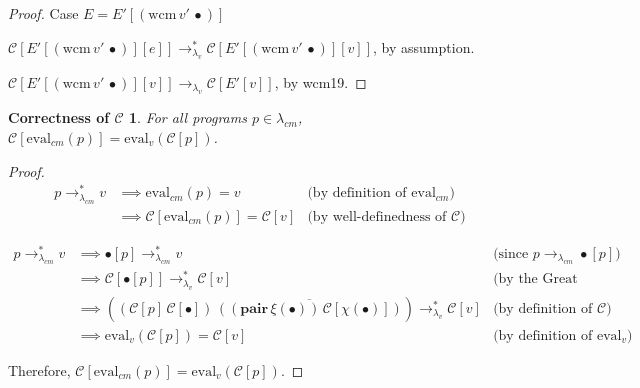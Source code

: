 \documentclass[ms,electronic,twosidetoc,letterpaper,chaptercenter,parttop]{byumsphd}
\newcommand{\pair}[2]{((\mathbf{pair}\,#1)\,#2)}
\newcommand{\eval}[1]{\overline{#1}}
\newcommand{\lvrr}{\rightarrow_{\lambda_v}}
\newcommand{\lvrrs}{\rightarrow_{\lambda_v}^{*}}
\newcommand{\cmrr}{\rightarrow_{\lambda_{cm}}}
\newcommand{\cmrrs}{\rightarrow_{\lambda_{cm}}^{*}}
\newcommand{\C}[1]{\mathcal{C}[#1]}
\newcommand{\app}[2]{(#1\,#2)}
\newcommand{\wcm}[2]{(\mathrm{wcm}\,#1\,#2)}
\newcommand{\hole}{\bullet}
\begin{document}
\begin{proof}{Case $E=E'[\wcm{v'}{\hole}]$}

$\C{E'[\wcm{v'}{\hole}][e]}\lvrrs\C{E'[\wcm{v'}{\hole}][v]}$, by assumption.

$\C{E'[\wcm{v'}{\hole}][v]}\lvrr \C{E'[v]}$, by wcm19. 
\end{proof}

\newtheorem*{maintheorem}{Correctness of $\mathcal{C}$}
\begin{maintheorem}
For all programs $p\in\lambda_{cm}$, $\C{\mathrm{eval}_{cm}(p)}=\mathrm{eval}_{v}(\C{p})$.
\end{maintheorem}

\begin{proof}

\begin{align*}
p\cmrrs v &\implies\mathrm{eval}_{cm}(p)=v &\text{(by definition of $\mathrm{eval}_{cm}$)}\\
          &\implies\C{\mathrm{eval}_{cm}(p)}=\C{v} &\text{(by well-definedness of $\mathcal{C}$)}
\end{align*}







\begin{align*}
p\cmrrs v &\implies\hole[p]\cmrrs v &\text{(since $p\cmrr\hole[p]$)}\\
          &\implies\C{\hole[p]}\lvrrs\C{v} &\text{(by the Great Lemma)}\\
          &\implies\app{\app{\C{p}}{\C{\hole}}}{\eval{\pair{\xi(\hole)}{\C{\chi(\hole)}}}}\lvrrs\C{v}&\text{(by definition of $\mathcal{C}$)}\\
          &\implies\mathrm{eval}_{v}(\C{p})=\C{v} &\text{(by definition of $\mathrm{eval}_v$)}
\end{align*}

Therefore, $\C{\mathrm{eval}_{cm}(p)}=\mathrm{eval}_{v}(\C{p})$.
\end{proof}
\end{document}
